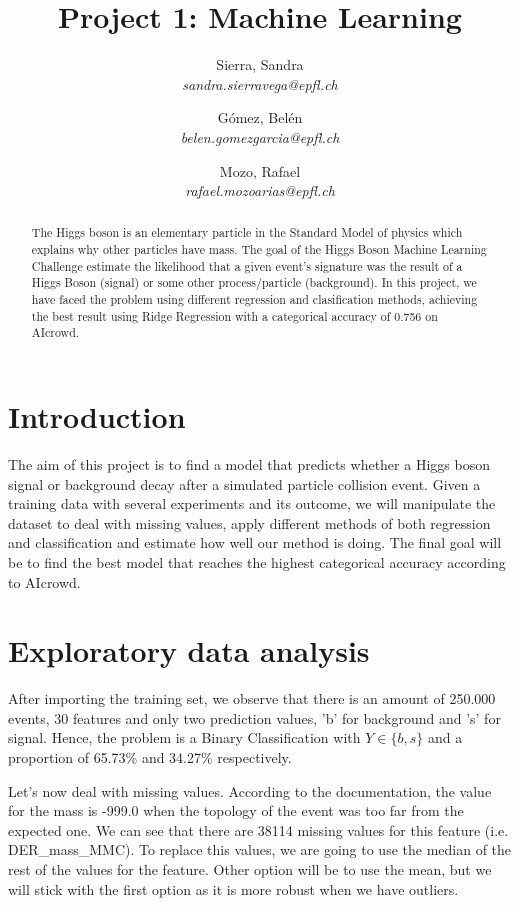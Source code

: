 \documentclass[10pt,conference,compsocconf]{IEEEtran}
\begin{document}
\title{Project 1: Machine Learning}
\author{
  Sierra, Sandra\\
  \textit{sandra.sierravega@epfl.ch}
  \and
  Gómez, Belén\\
  \textit{belen.gomezgarcia@epfl.ch}
  \and
  Mozo, Rafael\\
  \textit{rafael.mozoarias@epfl.ch}
}
\maketitle

\begin{abstract}
    The Higgs boson is an elementary particle in the Standard Model of physics which explains why other particles have mass. The goal of the Higgs Boson Machine Learning Challenge estimate the likelihood that a given event’s signature was the result of a Higgs Boson (signal) or some other process/particle (background). In this project, we have faced the problem using different regression and clasification methods, achieving the best result using Ridge Regression with a categorical accuracy of 0.756 on AIcrowd.
\end{abstract}

\section{Introduction}
    The aim of this project is to find a model that predicts whether a Higgs boson signal or background decay after a simulated particle collision event. Given a training data with several experiments and its outcome, we will manipulate the dataset to deal with missing values, apply different methods of both regression and classification and estimate how well our method is doing. The final goal will be to find the best model that reaches the highest categorical accuracy according to AIcrowd.\\
    
\section{Exploratory data analysis}
\label{sec:structure-paper}
    After importing the training set, we observe that there is an amount of 250.000 events, 30 features and only two prediction values, 'b' for background and 's' for signal. Hence, the problem is a Binary Classification with $Y \in \lbrace b, s \rbrace$ and a proportion of  65.73\% and 34.27\% respectively.
    
    Let's now deal with missing values. According to the documentation, the value for the mass is -999.0 when the topology of the event was too far from the expected one. We can see that there are 38114 missing values for this feature (i.e. DER\_mass\_MMC). To replace this values, we are going to use the median of the rest of the values for the feature. Other option will be to use the mean, but we will stick with the first option as it is more robust when we have outliers.
    
\end{document}
